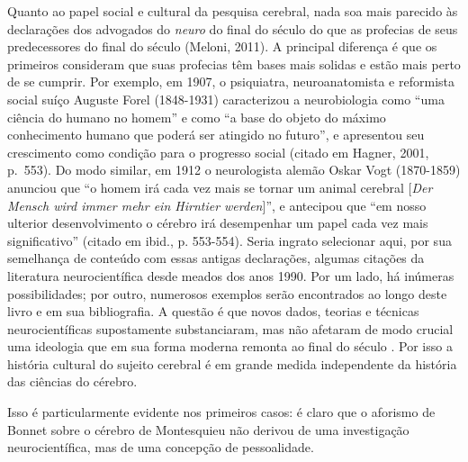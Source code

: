 Quanto ao papel social e cultural da pesquisa cerebral, nada soa mais
parecido às declarações dos advogados do \emph{neuro} do final do século
 do que as profecias de seus predecessores do final do século 
(Meloni, 2011). A principal diferença é que os primeiros consideram que
suas profecias têm bases mais solidas e estão mais perto de se cumprir.
Por exemplo, em 1907, o psiquiatra, neuroanatomista e reformista social
suíço Auguste Forel (1848-1931) caracterizou a neurobiologia como ``uma
ciência do humano no homem'' e como ``a base do objeto do máximo
conhecimento humano que poderá ser atingido no futuro'', e apresentou
seu crescimento como condição para o progresso social (citado em Hagner,
2001, p.~553). Do modo similar, em 1912 o neurologista alemão Oskar Vogt
(1870-1859) anunciou que ``o homem irá cada vez mais se tornar um animal
cerebral {[}\emph{Der Mensch wird immer mehr ein Hirntier werden}{]}'',
e antecipou que ``em nosso ulterior desenvolvimento o cérebro irá
desempenhar um papel cada vez mais significativo'' (citado em ibid., p.
553-554). Seria ingrato selecionar aqui, por sua semelhança de conteúdo
com essas antigas declarações, algumas citações da literatura
neurocientífica desde meados dos anos 1990. Por um lado, há inúmeras
possibilidades; por outro, numerosos exemplos serão encontrados ao longo
deste livro e em sua bibliografia. A questão é que novos dados, teorias
e técnicas neurocientíficas supostamente substanciaram, mas não afetaram
de modo crucial uma ideologia que em sua forma moderna remonta ao final
do século . Por isso a história cultural do sujeito cerebral é em
grande medida independente da história das ciências do cérebro.

Isso é particularmente evidente nos primeiros casos: é claro que o
aforismo de Bonnet sobre o cérebro de Montesquieu não derivou de uma
investigação neurocientífica, mas de uma concepção de pessoalidade.


